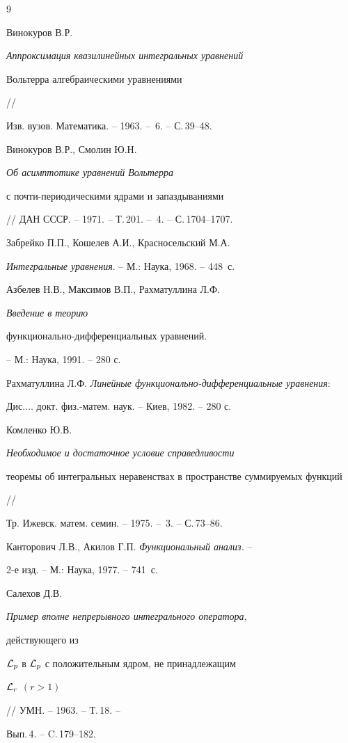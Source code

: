 \begin{thebibliography}{9}







Винокуров В.Р. {\em Аппроксимация квазилинейных интегральных уравнений 


Вольтерра алгебраическими уравнениями} //


Изв. вузов. Математика. -- 1963. -- \No\,6. -- С.\,39--48.




Винокуров В.Р., Смолин Ю.Н. {\em Об асимптотике уравнений Вольтерра


с почти-периодическими ядрами и запаздываниями}


// ДАН СССР. -- 1971. -- Т.\,201. -- \No\,4. -- С.\,1704--1707.




Забрейко П.П., Кошелев А.И., Красносельский М.А.


{\em Интегральные уравнения}. -- М.: Наука, 1968. -- 448~с.




Азбелев Н.В., Максимов В.П., Рахматуллина Л.Ф. {\em Введение в теорию


функционально-дифференциальных уравнений.} -- М.: Наука, 1991. -- 280 с.




Рахматуллина Л.Ф. {\em Линейные функционально-дифференциальные уравнения}:


Дис.\;$\dotsc$ докт. физ.-матем. наук. -- Киев, 1982. -- 280 с.




Комленко Ю.В. {\em Необходимое и достаточное условие справедливости


теоремы об интегральных неравенствах в пространстве суммируемых функций} //


Тр. Ижевск. матем. семин. -- 1975. -- \No\,3. -- С.\,73--86.




Канторович Л.В., Акилов Г.П. {\em Функциональный анализ.} --


2-е изд. -- М.: Наука, 1977. -- 741~с.




Салехов Д.В. {\em Пример вполне непрерывного интегрального оператора, 


действующего из


${\cal L}_p$ в ${\cal L}_p$ с положительным ядром, не принадлежащим


${\cal L}_r$ $(r>1)$} // УМН. -- 1963. -- Т.\,18. --


Вып.\,4. -- C.\,179--182.





\end{thebibliography}






